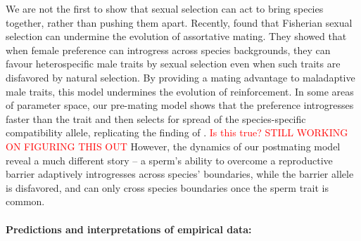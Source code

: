 \documentclass[11pt]{article}
\begin{document}
We are not the first to show that sexual selection can act to  bring species together, rather than pushing them apart. 
Recently, \citet{servedio2014}  found that Fisherian sexual selection can undermine the evolution of assortative mating.
They showed that when female preference can introgress across  species backgrounds, they can favour heterospecific male traits by sexual selection even when such traits are disfavored by natural selection.   
By  providing a mating advantage to maladaptive male traits, this model undermines the evolution of reinforcement.  
In some areas of parameter space, our pre-mating model shows that the preference introgresses faster than the trait and then selects for spread of the species-specific compatibility allele, replicating the finding of \citet{servedio2014}.  \textcolor{red}{Is this true? STILL WORKING ON FIGURING THIS OUT}  
However, the dynamics of our postmating model reveal a much different story -- a sperm's ability to overcome a reproductive barrier adaptively introgresses across species' boundaries, while the barrier allele is disfavored, and can only cross species boundaries once the sperm trait is common. \



\paragraph{Predictions and interpretations of empirical data:}      
\end{document}
